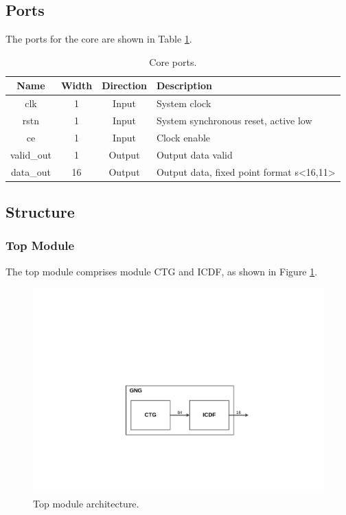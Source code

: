 \documentclass[a4paper, titlepage]{article}
\begin{document}
\subsection{Ports}
The ports for the core are shown in Table \ref{tbl:coreport}.
\begin{table}[!htbp]
\centering
\caption{Core ports.}
\label{tbl:coreport}
\begin{tabular}{cccl}
    \addlinespace
    \toprule

    \textbf{Name} & \textbf{Width} & \textbf{Direction} & \textbf{Description} \\

    \midrule

    \textsf{clk} & 1 & Input & System clock \\
    \textsf{rstn} & 1 & Input & System synchronous reset, active low \\
    \textsf{ce} & 1 & Input & Clock enable \\
    \textsf{valid\_out} & 1 & Output & Output data valid \\
    \textsf{data\_out} & 16 & Output & Output data, fixed point format s<16,11> \\

    \bottomrule
\end{tabular}
\end{table}

\subsection{Structure}
\subsubsection{Top Module}
The top module comprises module \textsf{CTG} and \textsf{ICDF},
as shown in Figure \ref{fig:topmodule}.
\begin{figure}[!htbp]
\centering
\includegraphics[scale=0.7,angle=270]{topmodule.pdf}
\caption{Top module architecture.}
\label{fig:topmodule}
\end{figure}
\end{document}

